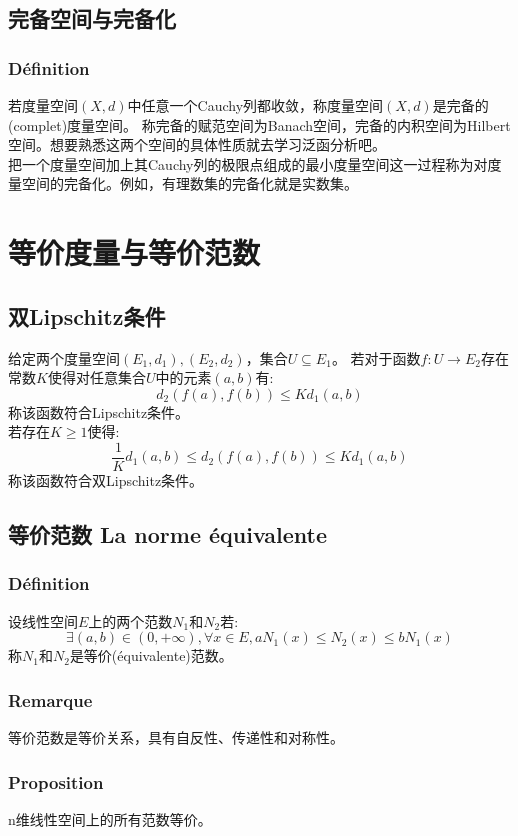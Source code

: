 \documentclass[12pt, a4paper, oneside]{ctexbook}
\begin{document}
  \subsection{完备空间与完备化}
  \subsubsection{Définition}
  若度量空间$(X,d)$中任意一个Cauchy列都收敛，称度量空间$(X,d)$是完备的(complet)度量空间。
  称完备的赋范空间为Banach空间，完备的内积空间为Hilbert空间。想要熟悉这两个空间的具体性质就去学习泛函分析吧。\\

  把一个度量空间加上其Cauchy列的极限点组成的最小度量空间这一过程称为对度量空间的完备化。例如，有理数集的完备化就是实数集。

\section{等价度量与等价范数}  \label{myref:normeq}
  \subsection{双Lipschitz条件}
  给定两个度量空间$(E_1,d_1),(E_2,d_2)$，集合$U\subseteq E_1$。
  若对于函数$f:U\rightarrow E_2$存在常数$K$使得对任意集合$U$中的元素$(a,b)$有:
  $$
  d_2(f(a),f(b))\leq Kd_1(a,b)
  $$
  称该函数符合Lipschitz条件。\\
  若存在$K\ge 1$使得:
  $$
  \frac{1}{K}d_1(a,b)\leq d_2(f(a),f(b))\leq Kd_1(a,b)
  $$
  称该函数符合双Lipschitz条件。
  \subsection{等价范数 La norme équivalente}
  \subsubsection{Définition}
  设线性空间$E$上的两个范数$N_1$和$N_2$若:
  $$
    \exists(a,b)\in(0,+\infty),\forall x\in E,aN_1(x)\leq N_2(x)\leq bN_1(x)
  $$称$N_1$和$N_2$是等价(équivalente)范数。
  \subsubsection{Remarque}
  等价范数是等价关系，具有自反性、传递性和对称性。
  \subsubsection{Proposition}
  n维线性空间上的所有范数等价。
\end{document}
